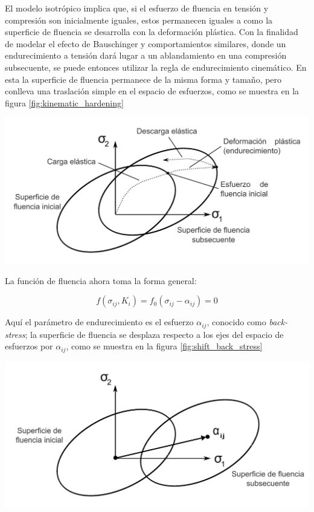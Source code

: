 El modelo isotrópico implica que, si el esfuerzo de fluencia en tensión y compresión son 
inicialmente iguales, estos permanecen iguales a como la superficie de fluencia se desarrolla 
con la deformación plástica. Con la finalidad de modelar el efecto de Bauschinger y comportamientos 
similares, donde un endurecimiento a tensión dará lugar a un ablandamiento en una compresión 
subsecuente, se puede entonces utilizar la regla de endurecimiento cinemático. En esta 
la superficie de fluencia permanece de la misma forma y tamaño, pero conlleva una traslación simple 
en el espacio de esfuerzos, como se muestra en la figura \ref{fig:kinematic_hardening}


\begin{center}
\includegraphics[scale=0.8]{src/ch2/kinematic_hardening}
\label{fig:kinematic_hardening}
\end{center}

La función de fluencia ahora toma la forma general:

\begin{equation}
f(\sigma_{ij}, K_i) = f_0 (\sigma_{ij} - \alpha_{ij}) = 0
\end{equation}

Aquí el parámetro de endurecimiento es el esfuerzo $\alpha_{ij}$, conocido como \textit{back-stress}; 
la superficie de fluencia se desplaza respecto a los ejes del espacio de esfuerzos por $\alpha_{ij}$, 
como se muestra en la figura \ref{fig:shift_back_stress}

\begin{center}
\includegraphics[scale=0.8]{src/ch2/shift_back_stress}
\label{fig:shift_back_stress}
\end{center}


